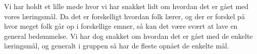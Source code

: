 Vi har holdt et lille m\o{}de hvor vi har snakket lidt om hvordan det er g\aa{}et med vores l\ae{}ringsm\aa{}l. Da det er forskelligt hvordan folk l\ae{}rer, og der er forskel p\aa{} hvor meget folk g\aa{}r op i forskellige emner, s\aa{} kan det v\ae{}re sv\ae{}rt at lave en general bed\o{}mmelse. Vi har dog snakket om hvordan det er g\aa{}et med de enkelte l\ae{}ringsm\aa{}l, og generalt i gruppen så har de fleste opnået de enkelte mål.

\begin{comment}
I skal beskrive jeres arbejdsprocesser i P1 s\aa{} detaljeret som muligt indenfor de fire omr\aa{}der:
    •   Projektplanl\ae{}gning
    •   Gruppesamarbejde
    •   Samarbejde med vejledere
    •   L\ae{}reprocesser
Beskrivelsen kan eksempelvis give et overblik over udviklingen i jeres arbejdsprocesser, \ae{}ndringer
i processer undervejs, l\ae{}ringsm\aa{}l, forventningsafklaringer i gruppen og med vejleder, aktiviteter til
opf\o{}lgning af m\aa{}ls\ae{}tninger osv.


\subsection{Vurdering}

N\aa{}r I er f\ae{}rdige med at beskrive hvad I gjorde, skal I vurdere hvordan det efter jeres mening gik.
Eksempelvis kan i komme ind p\aa{}, hvordan i fulgte op p\aa{} gruppens beslutninger og m\aa{}ls\ae{}tninger og
i hvilket omfang jeres arbejdsprocesser indenfor de fire omr\aa{}der fungerede efter hensigten.


\subsection{Analyse}

Dern\ae{}st skal I analysere jeres arbejdsprocesser og f\aa{} klarlagt hvorfor noget gik godt mens andet gik
d\aa{}rligt. Med andre ord: Hvilke faktorer har indvirket p\aa{} arbejdsprocesserne, og hvordan h\aa{}ndterede
i de udfordringer der opstod undervejs?


\subsection{Syntese}

Hvis jeres vurdering og analyse skal bidrage til at forbedre jeres evne til at h\aa{}ndtere det
problemorienterede og projektorganiserede gruppearbejde, skal I til slut konkretisere jeres
erfaringer i nogle ’Gode r\aa{}d’ til jer selv og jeres medstuderende. En god m\aa{}de at formulere s\aa{}danne
gode r\aa{}d p\aa{} er som en ’start-stop-forts\ae{}t’-liste, dvs. en liste med f\o{}lgende tre sektioner:
    •   Dette vil vi begynde at g\o{}re i P2, som vi ikke gjorde i P1
    •   Dette vil vi ikke g\o{}re i P2, som vi gjorde i P1
    •   Dette vil vi forts\ae{}tte med at g\o{}re (gerne anderledes og bedre) i P2, som vi ogs\aa{} gjorde i P1
Det er en god idé at tage ét af de fire omr\aa{}der ad gangen og g\o{}re det f\ae{}rdigt. Husk hvad ang\aa{}r
strukturen at skelne klart mellem beskrivelse; vurdering og analyse og husk, at de ’Gode r\aa{}d’ skal
v\ae{}re konkrete og operationelle, s\aa{} de f\o{}rer til reelle forbedringer i P2.
\end{comment}